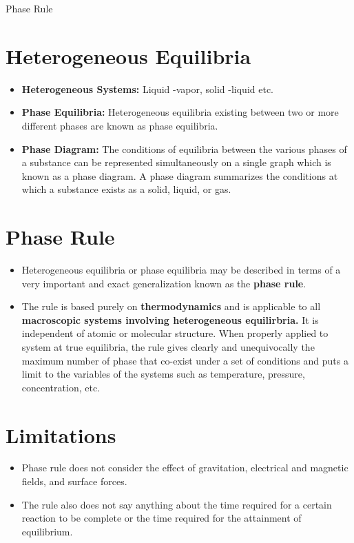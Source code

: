 \documentclass[a4paper,12pt,twocolumn]{article}
\begin{document}
\begin{center}
\huge{Phase Rule}
\end{center}

\section{Heterogeneous Equilibria}
\begin{itemize}
\item \textbf{Heterogeneous Systems:} Liquid -vapor, solid -liquid etc. 
\item \textbf{Phase Equilibria:} Heterogeneous equilibria existing between two or more different phases are known as phase equilibria.
\item \textbf{Phase Diagram:} The conditions of equilibria between the various phases of a substance can be represented simultaneously on a single graph which is known as a phase diagram. A phase diagram summarizes the conditions at which a substance exists as a solid, liquid, or gas.
\end{itemize}

\section{Phase Rule}
\begin{itemize}
\item Heterogeneous equilibria or phase equilibria may be described in terms of a very important and exact generalization known as the \textbf{phase rule}.
\item The rule is based purely on \textbf{thermodynamics} and is applicable to all \textbf{macroscopic systems involving heterogeneous equilirbria.} It is independent of atomic or molecular structure. When properly applied to system at true equilibria, the rule gives clearly and unequivocally the maximum number of phase that co-exist under a set of conditions and puts a limit to the variables of the systems such as temperature, pressure, concentration, etc. 
\end{itemize}

\section{Limitations}
\begin{itemize}
\item Phase rule does not consider the effect of gravitation, electrical and magnetic fields, and surface forces. 
\item The rule also does not say anything about the time required for a certain reaction to be complete or the time required for the attainment of equilibrium. 
\end{itemize}
\end{document}
